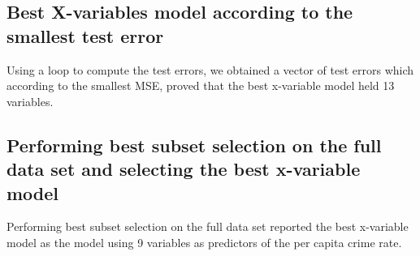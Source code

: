 \documentclass{article}
\begin{document}
\subsection{Best X-variables model according to the smallest test error}

Using a loop to compute the test errors, we obtained a vector of test errors which according to the smallest MSE, proved that the best x-variable model held 13 variables.

\subsection{Performing best subset selection on the full data set and selecting the best x-variable model}

Performing best subset selection on the full data set reported the best x-variable model as the model using 9 variables as predictors of the per capita crime rate.
\newpage
\end{document}

